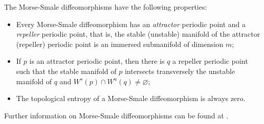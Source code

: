 \documentclass[sn-mathphys-num]{sn-jnl}%
\theoremstyle{thmstyleone}%
\theoremstyle{thmstyletwo}%
\theoremstyle{thmstylethree}%
\newtheorem{definition}{Definition}%
\begin{document}
The Morse-Smale diffeomorphisms have the following properties:
\begin{itemize}
    \item Every Morse-Smale diffeomorphism has an \textit{attractor} periodic point and a \textit{repeller} periodic point, that is, the stable (unstable) manifold of the attractor (repeller) periodic point is an immersed submanifold of dimension $m$;
    \item If $p$ is an attractor periodic point, then there is $q$ a repeller periodic point such that the stable manifold of $p$ intersects transversely the unstable manifold of $q$ and $W^s(p) \cap W^u(q) \neq \varnothing$;
    \item The topological entropy of a Morse-Smale diffeomorphism is always zero.
\end{itemize}

Further information on Morse-Smale diffeomorphisms can be found at \cite{arbieto_bohorquez_2023}.




\end{document}
